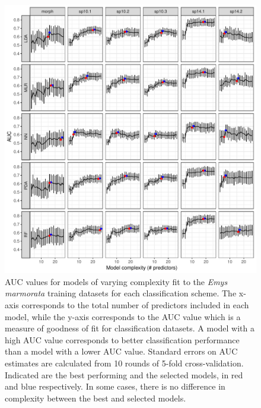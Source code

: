 \documentclass[fleqn,10pt,lineno]{wlpeerj} %
\begin{document}
\afterpage{\clearpage}
\begin{figure}[ht]
  \centering
  \includegraphics[height = \textheight, width = \textwidth, keepaspectratio = true]{figure/emys_model_sel}
  \caption{AUC values for models of varying complexity fit to the \textit{Emys marmorata} training datasets for each classification scheme. The x-axis corresponds to the total number of predictors included in each model, while the y-axis corresponds to the AUC value which is a measure of goodness of fit for classification datasets. A model with a high AUC value corresponds to better classification performance than a model with a lower AUC value. Standard errors on AUC estimates are calculated from 10 rounds of 5-fold cross-validation. Indicated are the best performing and the selected models, in red and blue respectively. In some cases, there is no difference in complexity between the best and selected models.}
  \label{fig:emys_sel}
\end{figure}
\end{document}

